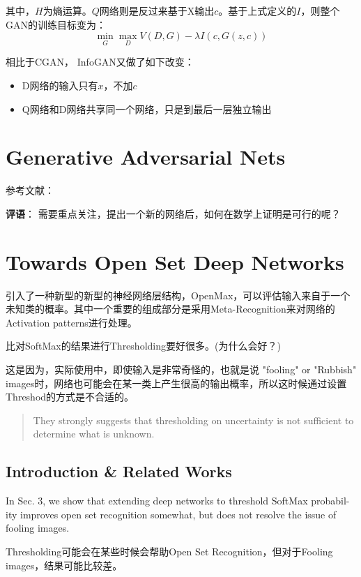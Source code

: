 其中，$H$为熵运算。$Q$网络则是反过来基于X输出$c$。基于上式定义的$I$，则整个GAN的训练目标变为：
\begin{displaymath}
\min_G \max_D V(D, G) - \lambda I(c, G(z, c))
\end{displaymath}

相比于CGAN， InfoGAN又做了如下改变：
\begin{itemize}
\item D网络的输入只有$x$，不加$c$
\item Q网络和D网络共享同一个网络，只是到最后一层独立输出
\end{itemize}

\section{Generative Adversarial Nets}

参考文献：\cite{Goodfellow2014GAN}

{\color{red} \textbf{评语}： 需要重点关注，提出一个新的网络后，如何在数学上证明是可行的呢？}




\section{Towards Open Set Deep Networks}

引入了一种新型的新型的神经网络层结构，OpenMax，可以评估输入来自于一个未知类的概率。其中一个重要的组成部分是采用Meta-Recognition来对网络的Activation patterns进行处理。

比对SoftMax的结果进行Thresholding要好很多。(为什么会好？)

这是因为，实际使用中，即使输入是非常奇怪的，也就是说 "fooling" or "Rubbish" images时，网络也可能会在某一类上产生很高的输出概率，所以这时候通过设置Threshod的方式是不合适的。
\begin{quote}
They strongly
suggests that thresholding on uncertainty is not sufficient
to determine what is unknown.
\end{quote}

\subsection{Introduction \& Related Works}

In Sec. 3, we show that
extending deep networks to threshold SoftMax probabil-
ity improves open set recognition somewhat, but does not
resolve the issue of fooling images.

Thresholding可能会在某些时候会帮助Open Set Recognition，但对于Fooling images，结果可能比较差。

